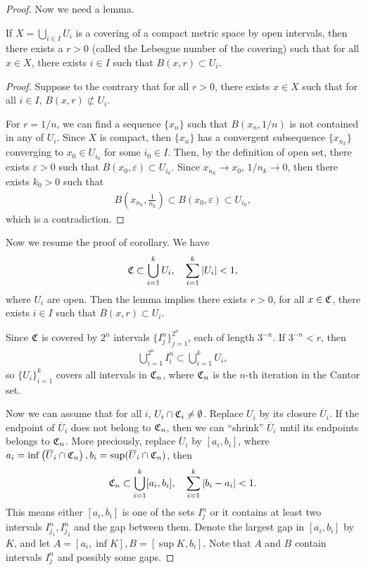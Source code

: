 \begin{proof}
\medskip

Now we need a lemma.

\medskip

\begin{lemma}
If $X = \bigcup_{i\in I} U_i$ is a covering of a compact metric space by open intervals, then there exists a $r > 0$ (called the Lebesgue number of the covering) such that for all $x \in X$, there exists $i \in I$ such that $B(x,r) \subset U_i$.
\end{lemma}
\begin{proof}
Suppose to the contrary that for all $r > 0$, there exists $x \in X$ such that for all $i \in I$, $B(x,r) \not\subset U_i$. 

For $r = 1/n$, we can find a sequence $\{x_n\}$ such that $B(x_n,1/n)$ is not contained in any of $U_i$. Since $X$ is compact, then $\{x_n\}$ has a convergent subsequence $\{x_{n_k}\}$ converging to $x_0 \in U_{i_0}$ for some $i_0 \in I$. Then, by the definition of open set, there exists $\varepsilon > 0$ such that $B(x_0,\varepsilon) \subset U_{i_0}$. Since $x_{n_k} \to x_0$, $1/n_k \to 0$, then there exists $k_0 > 0$ such that
\begin{align*}
    B\left(x_{n_k},\frac{1}{n_k}\right) \subset B(x_0,\varepsilon) \subset U_{i_0},
\end{align*}
which is a contradiction.
\end{proof}

\medskip

Now we resume the proof of corollary. We have 
\begin{align*}
    \mathfrak{C} \subset \bigcup^k_{i=1} U_i, \quad \sum^k_{i=1} \left|U_i\right| < 1,
\end{align*}
where $U_i$ are open. Then the lemma implies there exists $r > 0$, for all $x \in \mathfrak{C}$, there exists $i \in I$ such that $B(x,r) \subset U_i$.

Since $\mathfrak{C}$ is covered by $2^n$ intervals $\{I^n_j\}^{2^n}_{j=1}$, each of length $3^{-n}$. If $3^{-n} < r$, then
\begin{align*}
    \bigcup^{2^n}_{i=1} I^n_i \subset \bigcup^k_{i=1} U_i,
\end{align*}
so $\{U_i\}^k_{i=1}$ covers all intervals in $\mathfrak{C}_n$, where $\mathfrak{C}_n$ is the $n$-th iteration in the Cantor set.


Now we can assume that for all $i$, $U_i \cap \mathfrak{C}_i \neq \emptyset$. Replace $U_i$ by its closure $\overline{U}_i$. If the endpoint of $\overline{U}_i$ does not belong to $\mathfrak{C}_n$, then we can ``shrink'' $\overline{U}_i$ until its endpoints belongs to $\mathfrak{C}_n$. More preciously, replace $\overline{U}_i$ by $[a_i,b_i]$, where $a_i = \inf \left(\overline{U}_i \cap \mathfrak{C}_n\right), b_i = \sup (\overline{U}_i \cap \mathfrak{C}_n)$, then
\begin{align*}
    \mathfrak{C}_n \subset \bigcup^k_{i=1} [a_i,b_i], \quad \sum^k_{i=1} \left|b_i - a_i\right| < 1.
\end{align*}
This means either $[a_i,b_i]$ is one of the sets $I^n_j$ or it contains at least two intervals $I^n_{j_1}, I^n_{j_2}$ and the gap between them. Denote the largest gap in $[a_i,b_i]$ by $K$, and let $A = [a_i,\inf K], B = [\sup K,b_i]$. Note that $A$ and $B$ contain intervals $I^n_j$ and possibly some gaps. 


\end{proof}

